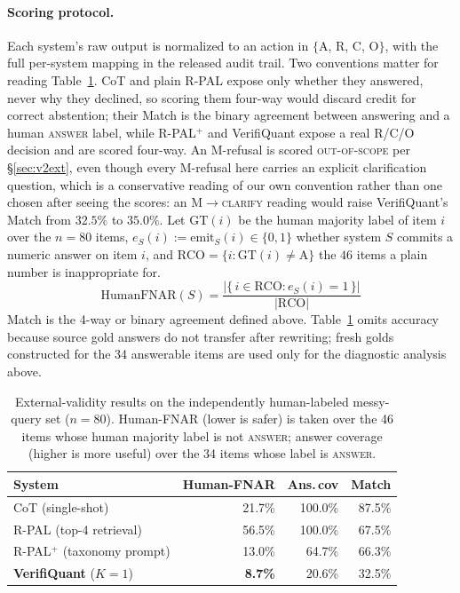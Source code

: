 \documentclass[sigconf,anonymous]{acmart}
\begin{document}
\paragraph{Scoring protocol.}
Each system's raw output is normalized to an action in $\{$A, R, C, O$\}$, with the full per-system mapping in the released audit trail. Two conventions matter for reading Table~\ref{tab:v2ext}. CoT and plain R-PAL expose only whether they answered, never why they declined, so scoring them four-way would discard credit for correct abstention; their Match is the binary agreement between answering and a human \textsc{answer} label, while R-PAL$^{+}$ and VerifiQuant expose a real R/C/O decision and are scored four-way. An M-refusal is scored \textsc{out-of-scope} per \S\ref{sec:v2ext}, even though every M-refusal here carries an explicit clarification question, which is a conservative reading of our own convention rather than one chosen after seeing the scores: an \textsc{M}$\to$\textsc{clarify} reading would raise VerifiQuant's Match from $32.5\%$ to $35.0\%$. Let $\mathrm{GT}(i)$ be the human majority label of item $i$ over the $n{=}80$ items, $e_S(i){:=}\mathrm{emit}_S(i){\in}\{0,1\}$ whether system $S$ commits a numeric answer on item $i$, and $\mathrm{RCO}=\{i : \mathrm{GT}(i)\neq\text{A}\}$ the $46$ items a plain number is inappropriate for.
\[
\mathrm{HumanFNAR}(S) = \frac{|\{\, i \in \mathrm{RCO} : e_S(i){=}1 \,\}|}{|\mathrm{RCO}|}
\]
Match is the 4-way or binary agreement defined above. Table~\ref{tab:v2ext} omits accuracy because source gold answers do not transfer after rewriting; fresh golds constructed for the 34 answerable items are used only for the diagnostic analysis above.

\begin{table}[t]
\caption{External-validity results on the independently human-labeled messy-query set ($n{=}80$). Human-FNAR (lower is safer) is taken over the 46 items whose human majority label is not \textsc{answer}; answer coverage (higher is more useful) over the 34 items whose label is \textsc{answer}.}
\label{tab:v2ext}
\small
\begin{tabular}{@{}lrrr@{}}
\toprule
System & Human-FNAR & Ans.\,cov & Match \\
\midrule
CoT (single-shot) & 21.7\% & 100.0\% & 87.5\% \\
R-PAL (top-4 retrieval) & 56.5\% & 100.0\% & 67.5\% \\
R-PAL$^{+}$ (taxonomy prompt) & 13.0\% & 64.7\% & 66.3\% \\
\textbf{VerifiQuant} ($K{=}1$) & \textbf{8.7\%} & 20.6\% & 32.5\% \\
\bottomrule
\end{tabular}
\end{table}
\end{document}
